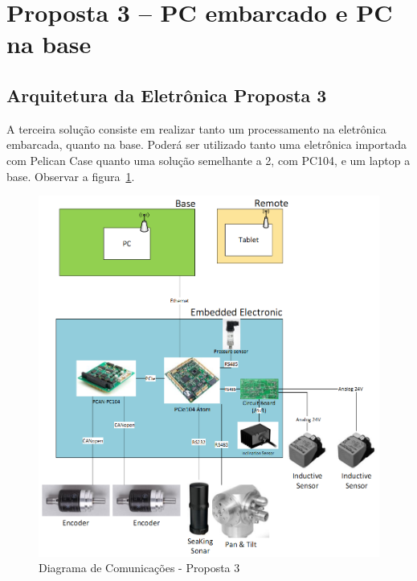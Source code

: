 


\section{Proposta 3 – PC embarcado e PC na base}

\subsection{Arquitetura da Eletrônica Proposta 3}
A terceira solução consiste em realizar tanto um processamento na eletrônica
embarcada, quanto na base. Poderá ser utilizado tanto uma eletrônica importada
com Pelican Case quanto uma solução semelhante a 2, com PC104, e um laptop a
base. Observar a figura~\ref{prop3}.

\begin{figure}[H]
    \centering
    \includegraphics[width=0.8\columnwidth]{figs/eletronica/5.png}
    \caption{Diagrama de Comunicações - Proposta 3}
    \label{prop3}
\end{figure} 


